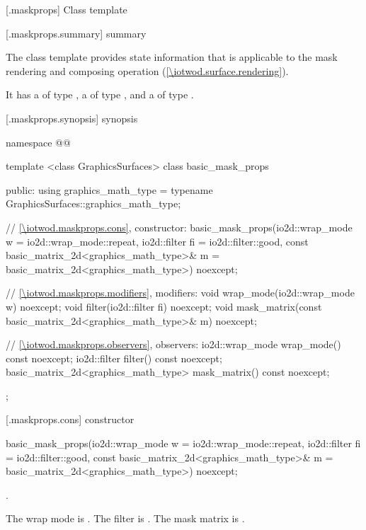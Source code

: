 
 [\iotwod.maskprops] {Class template }

 [\iotwod.maskprops.summary] { summary}

\pnum
The  class template provides state information that is applicable to the mask rendering and composing operation (\ref{\iotwod.surface.rendering}).

\pnum
It has a  of type , a  of type , and a  of type .

 [\iotwod.maskprops.synopsis] { synopsis}

\begin{codeblock}
namespace @\fullnamespace{}@ {
  template <class GraphicsSurfaces>
  class basic_mask_props {
    public:
    using graphics_math_type = typename GraphicsSurfaces::graphics_math_type;

    // \ref{\iotwod.maskprops.cons}, constructor:
    basic_mask_props(io2d::wrap_mode w = io2d::wrap_mode::repeat,
      io2d::filter fi = io2d::filter::good,
      const basic_matrix_2d<graphics_math_type>& m = basic_matrix_2d<graphics_math_type>{})
      noexcept;

    // \ref{\iotwod.maskprops.modifiers}, modifiers:
    void wrap_mode(io2d::wrap_mode w) noexcept;
    void filter(io2d::filter fi) noexcept;
    void mask_matrix(const basic_matrix_2d<graphics_math_type>& m) noexcept;

    // \ref{\iotwod.maskprops.observers}, observers:
    io2d::wrap_mode wrap_mode() const noexcept;
    io2d::filter filter() const noexcept;
    basic_matrix_2d<graphics_math_type> mask_matrix() const noexcept;
  };
}
\end{codeblock}

 [\iotwod.maskprops.cons] { constructor}

%
\begin{itemdecl}
basic_mask_props(io2d::wrap_mode w = io2d::wrap_mode::repeat,
  io2d::filter fi = io2d::filter::good,
  const basic_matrix_2d<graphics_math_type>& m = basic_matrix_2d<graphics_math_type>{}) noexcept;
\end{itemdecl}
\begin{itemdescr}
\requires
{}.

\pnum
\effects
The wrap mode is . The filter is . The mask matrix is .
\end{itemdescr}

